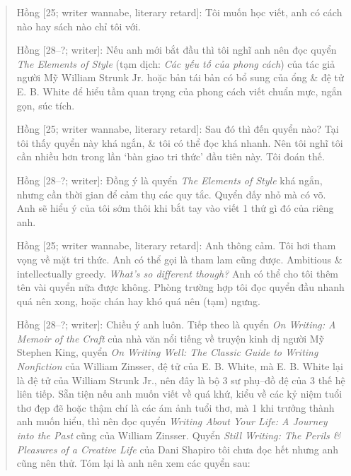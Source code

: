 \documentclass[12pt,twoside]{book}
\begin{document}
\begin{quote}
	{\sf Hồng [25; writer wannabe, literary retard]}: Tôi muốn học viết, anh có cách nào hay sách nào chỉ tôi với.
	
	{\sf Hồng [28--?; writer]}: Nếu anh mới bắt đầu thì tôi nghĩ anh nên đọc quyển {\it The Elements of Style} \cite{Strunk_element_style} (tạm dịch: {\it Các yếu tố của phong cách}) của tác giả người Mỹ {\sc William Strunk Jr.} hoặc bản tái bản có bổ sung \cite{Strunk_White_element_style} của ổng \& đệ tử {\sc E. B. White} để hiểu tầm quan trọng của phong cách viết chuẩn mực, ngắn gọn, súc tích.
	
	{\sf Hồng [25; writer wannabe, literary retard]}: Sau đó thì đến quyển nào? Tại tôi thấy quyển này khá ngắn, \& tôi có thể đọc khá nhanh. Nên tôi nghĩ tôi cần nhiều hơn trong lần `bàn giao tri thức' đầu tiên này. Tôi đoán thế.
	
	{\sf Hồng [28--?; writer]}: Đồng ý là quyển {\it The Elements of Style} khá ngắn, nhưng cần thời gian để cảm thụ các quy tắc. Quyển đấy nhỏ mà có võ. Anh sẽ hiểu ý của tôi sớm thôi khi bắt tay vào viết 1 thứ gì đó của riêng anh.
	
	{\sf Hồng [25; writer wannabe, literary retard]}: Anh thông cảm. Tôi hơi tham vọng về mặt tri thức. Anh có thể gọi là tham lam cũng được. Ambitious \& intellectually greedy. {\it What's so different though?} Anh có thể cho tôi thêm tên vài quyển nữa được không. Phòng trường hợp tôi đọc quyển đầu nhanh quá nên xong, hoặc chán hay khó quá nên (tạm) ngưng.
	
	{\sf Hồng [28--?; writer]}: Chiều ý anh luôn. Tiếp theo là quyển {\it On Writing: A Memoir of the Craft} \cite{King2000,King2010} của nhà văn nổi tiếng về truyện kinh dị người Mỹ {\sc Stephen King}, quyển {\it On Writing Well: The Classic Guide to Writing Nonfiction} \cite{Zinsser2001,Zinsser2016} của {\sc William Zinsser}, đệ tử của {\sc E. B. White}, mà {\sc E. B. White} lại là đệ tử của {\sc William Strunk Jr.}, nên đây là bộ 3 sư phụ--đồ đệ của 3 thế hệ liên tiếp. Sẵn tiện nếu anh muốn viết về quá khứ, kiểu về các kỷ niệm tuổi thơ đẹp đẽ hoặc thậm chí là các ám ảnh tuổi thơ, mà 1 khi trưởng thành anh muốn hiểu, thì nên đọc quyển {\it Writing About Your Life: A Journey into the Past} \cite{Zinsser2005} cũng của {\sc William Zinsser}. Quyển {\it Still Writing: The Perils \& Pleasures of a Creative Life} của {\sc Dani Shapiro} tôi chưa đọc hết nhưng anh cũng nên thử. Tóm lại là anh nên xem các quyển sau:
\end{quote}
\end{document}
